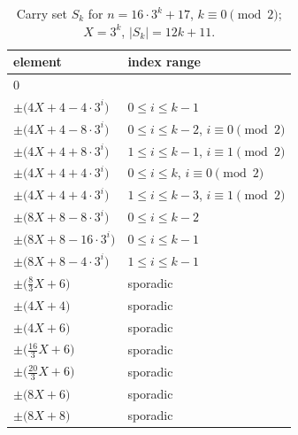 \begin{table}[htbp]\centering\small
\caption{Carry set $S_k$ for $n=16\cdot 3^k + 17$, $k\equiv 0\pmod{2}$; $X=3^k$, $|S_k|=12k+11$.}
\begin{tabular}{ll}\toprule
element & index range \\ \midrule
$0$ & \\
$\pm\bigl(4X + 4 - 4\cdot 3^i\bigr)$ & $0\le i\le k-1$ \\
$\pm\bigl(4X + 4 - 8\cdot 3^i\bigr)$ & $0\le i\le k-2$, $i\equiv 0\pmod 2$ \\
$\pm\bigl(4X + 4 + 8\cdot 3^i\bigr)$ & $1\le i\le k-1$, $i\equiv 1\pmod 2$ \\
$\pm\bigl(4X + 4 + 4\cdot 3^i\bigr)$ & $0\le i\le k$, $i\equiv 0\pmod 2$ \\
$\pm\bigl(4X + 4 + 4\cdot 3^i\bigr)$ & $1\le i\le k-3$, $i\equiv 1\pmod 2$ \\
$\pm\bigl(8X + 8 - 8\cdot 3^i\bigr)$ & $0\le i\le k-2$ \\
$\pm\bigl(8X + 8 - 16\cdot 3^i\bigr)$ & $0\le i\le k-1$ \\
$\pm\bigl(8X + 8 - 4\cdot 3^i\bigr)$ & $1\le i\le k-1$ \\
$\pm\bigl(\tfrac{8}{3}X + 6\bigr)$ & sporadic \\
$\pm\bigl(4X + 4\bigr)$ & sporadic \\
$\pm\bigl(4X + 6\bigr)$ & sporadic \\
$\pm\bigl(\tfrac{16}{3}X + 6\bigr)$ & sporadic \\
$\pm\bigl(\tfrac{20}{3}X + 6\bigr)$ & sporadic \\
$\pm\bigl(8X + 6\bigr)$ & sporadic \\
$\pm\bigl(8X + 8\bigr)$ & sporadic \\
\bottomrule\end{tabular}\end{table}

